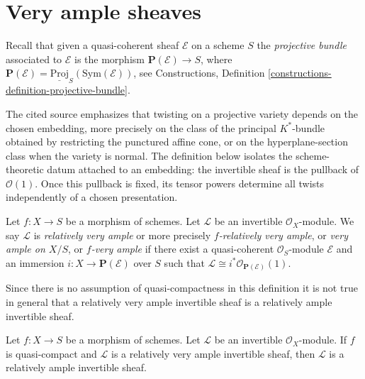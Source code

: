 \section{Very ample sheaves}
\label{section-very-ample}

\noindent
Recall that given a quasi-coherent sheaf $\mathcal{E}$ on a scheme
$S$ the {\it projective bundle} associated to $\mathcal{E}$ is the morphism
$\mathbf{P}(\mathcal{E}) \to S$, where
$\mathbf{P}(\mathcal{E}) = \underline{\text{Proj}}_S(\text{Sym}(\mathcal{E}))$,
see
Constructions, Definition \ref{constructions-definition-projective-bundle}.

\begin{definition}
\label{definition-very-ample}
\begin{reference}
\cite[Chapter III, \S 3, no. 66, Remark, pp. 259--260]{FAC}
\end{reference}
\begin{history}
The cited source emphasizes that twisting on a projective variety depends on
the chosen embedding, more precisely on the class of the principal
$K^*$-bundle obtained by restricting the punctured affine cone, or on the
hyperplane-section class when the variety is normal. The definition below
isolates the scheme-theoretic datum attached to an embedding: the invertible
sheaf is the pullback of $\mathcal{O}(1)$. Once this pullback is fixed, its
tensor powers determine all twists independently of a chosen presentation.
\end{history}
Let $f : X \to S$ be a morphism of schemes.
Let $\mathcal{L}$ be an invertible $\mathcal{O}_X$-module.
We say $\mathcal{L}$ is {\it relatively very ample} or more
precisely {\it $f$-relatively very ample}, or
{\it very ample on $X/S$}, or {\it $f$-very ample} if
there exist a quasi-coherent $\mathcal{O}_S$-module
$\mathcal{E}$ and an immersion $i : X \to \mathbf{P}(\mathcal{E})$
over $S$ such that
$\mathcal{L} \cong i^*\mathcal{O}_{\mathbf{P}(\mathcal{E})}(1)$.
\end{definition}



\noindent
Since there is no assumption of quasi-compactness in this definition it is not
true in general that a relatively very ample invertible sheaf is a relatively
ample invertible sheaf.

\begin{lemma}
\label{lemma-ample-very-ample}
\begin{reference}
\cite[II, Proposition 4.6.2]{EGA}
\end{reference}
Let $f : X \to S$ be a morphism of schemes.
Let $\mathcal{L}$ be an invertible $\mathcal{O}_X$-module.
If $f$ is quasi-compact and $\mathcal{L}$ is a relatively
very ample invertible sheaf, then $\mathcal{L}$ is a relatively
ample invertible sheaf.
\end{lemma}

